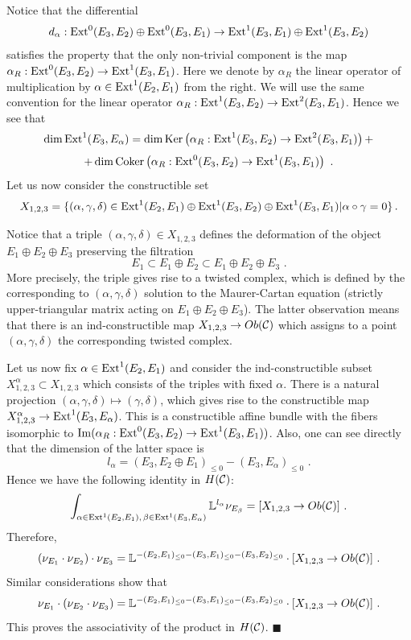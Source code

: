 \documentclass[12pt]{article}
\begin{document}
Notice that the differential $$d_{\alpha}: \operatorname{Ext}^0(E_3,E_2)\oplus \operatorname{Ext}^0(E_3,E_1)\to \operatorname{Ext}^1(E_3,E_1)\oplus \operatorname{Ext}^1(E_3,E_2)$$ satisfies the property that the only non-trivial component is the map
$\alpha_R: \operatorname{Ext}^0(E_3,E_2)\to \operatorname{Ext}^1(E_3,E_1)$. Here we  denote by $\alpha_R$ the linear operator of multiplication by $\alpha\in \operatorname{Ext}^1(E_2,E_1)$ from the right. We will use the same convention for the linear operator $\alpha_R: \operatorname{Ext}^1(E_3,E_2)\to \operatorname{Ext}^2(E_3,E_1)$.
Hence we see that
$$\dim \operatorname{Ext}^1(E_3,E_{\alpha})= \dim \operatorname{Ker}\left(\alpha_R: \operatorname{Ext}^1(E_3,E_2)\to \operatorname{Ext}^2(E_3,E_1)\right)+$$
$$+\dim \operatorname{Coker}\left(\alpha_R: \operatorname{Ext}^0(E_3,E_2)\to \operatorname{Ext}^1(E_3,E_1)\right)\,\,.$$
Let us now consider the constructible set
$$X_{1,2,3}=\{(\alpha,\gamma, \delta)\in \operatorname{Ext}^1(E_2,E_1)\oplus \operatorname{Ext}^1(E_3,E_2)\oplus \operatorname{Ext}^1(E_3,E_1)|\alpha\circ \gamma=0\}\,.$$


Notice that a triple $(\alpha,\gamma, \delta)\in X_{1,2,3}$ defines the deformation of the object $E_1\oplus E_2\oplus E_3$ preserving the  filtration
$$E_1\subset E_1\oplus E_2\subset E_1\oplus E_2\oplus E_3\,\,.$$ More precisely, the triple gives rise to a twisted complex, which is defined by the corresponding to $(\alpha,\gamma, \delta)$ solution to the Maurer-Cartan equation (strictly upper-triangular matrix acting on $E_1\oplus E_2\oplus E_3$). The latter observation means that there is an ind-constructible map $X_{1,2,3}\to Ob({\mathcal C})$ which assigns to a point $(\alpha,\gamma, \delta)$ the corresponding twisted complex.

Let us now fix $\alpha\in \operatorname{Ext}^1(E_2,E_1)$ and consider the ind-constructible subset
$X_{1,2,3}^{\alpha}\subset X_{1,2,3}$ which consists of the triples with fixed $\alpha$.
There is a natural projection $(\alpha,\gamma, \delta)\mapsto (\gamma,\delta)$,
which gives rise to the constructible map $X_{1,2,3}^{\alpha}\to \operatorname{Ext}^1(E_3,E_{\alpha})$. 
This is a constructible affine bundle with the fibers isomorphic to $\operatorname{Im}(\alpha_R: \operatorname{Ext}^0(E_3,E_2)\to \operatorname{Ext}^1(E_3,E_1))$. Also, one can see directly  that the dimension of the latter space is 
$$l_{\alpha}=(E_3,E_2\oplus E_1)_{\le 0}- (E_3,E_\alpha)_{\le 0}\,\,. $$ 
Hence we have the following identity in $H({\mathcal C})$:
$$\int_{  \alpha\in \operatorname{Ext}^1(E_2,E_1),\, \beta\in \operatorname{Ext}^1(E_3,E_{\alpha})}{\mathbb L}^{l_{\alpha}}\nu_{E_{\beta}}=[X_{1,2,3}\to Ob({\mathcal C})]\,\,.$$
Therefore, 
$$(\nu_{E_1}\cdot\nu_{E_2})\cdot \nu_{E_3}={\mathbb L}^{-(E_2,E_1)_{\le 0}-(E_3,E_1)_{\le 0}-(E_3,E_2)_{\le 0}}\cdot[X_{1,2,3}\to Ob({\mathcal C})]\,\,.$$
Similar considerations show that
$$\nu_{E_1}\cdot(\nu_{E_2}\cdot \nu_{E_3})=  {\mathbb L}^{-(E_2,E_1)_{\le 0}-(E_3,E_1)_{\le 0}-(E_3,E_2)_{\le 0}}\cdot[X_{1,2,3}\to Ob({\mathcal C})]\,\,.$$
This proves the associativity of the product in $H({\mathcal C})$.
$\blacksquare$
\end{document}
